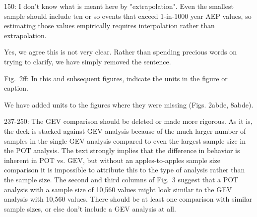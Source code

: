 \documentclass[12pt,english]{reviewresponse}
\begin{document}
\begin{revcomment}
 150: I don't know what is meant here by "extrapolation".  Even the smallest sample should include ten or so events that exceed 1-in-1000 year AEP values, so estimating those values empirically requires interpolation rather than extrapolation.
   
\end{revcomment}


\begin{revresponse}
Yes, we agree this is not very clear. Rather than spending precious words on trying to clarify, we have simply removed the sentence. 
\end{revresponse}

\begin{revcomment}
  Fig.\ 2ff: In this and subsequent figures, indicate the units in the figure or caption.
  
\end{revcomment}
\begin{revresponse}
    We have added units to the figures where they were missing (Figs. 2abde, 8abde). 
\end{revresponse}

\begin{revcomment}
	237-250: The GEV comparison should be deleted or made more rigorous.  As it is, the deck is stacked against GEV analysis because of the much larger number of samples in the single GEV analysis compared to even the largest sample size in the POT analysis.  The text strongly implies that the difference in behavior is inherent in POT vs. GEV, but without an apples-to-apples sample size comparison it is impossible to attribute this to the type of analysis rather than the sample size.  The second and third columns of Fig.\ 3 suggest that a POT analysis with a sample size of 10,560 values might look similar to the GEV analysis with 10,560 values.  There should be at least one comparison with similar sample sizes, or else don't include a GEV analysis at all.
\end{revcomment}
\end{document}
